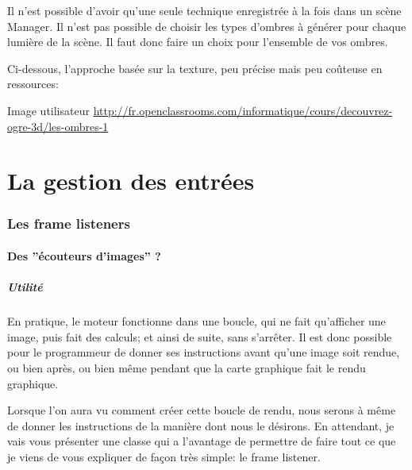 \documentclass[10pt,a4paper]{report}
\begin{document}
Il n'est possible d'avoir qu'une seule technique enregistr\'ee \`{a} la fois dans un sc\`ene Manager. Il n'est pas possible de choisir les types d'ombres \`{a} g\'en\'erer pour chaque lumi\`ere de la sc\`ene. Il faut donc faire un choix pour l'ensemble de vos ombres.

Ci-dessous, l'approche bas\'ee sur la texture, peu pr\'ecise mais peu co\^uteuse en ressources:

Image utilisateur \url{http://fr.openclassrooms.com/informatique/cours/decouvrez-ogre-3d/les-ombres-1}







\part{La gestion des entr\'ees}




\section{Les frame listeners}





\subsection{Des ''\'ecouteurs d'images'' ?}
\subsubsection{Utilit\'e}


En pratique, le moteur fonctionne dans une boucle, qui ne fait qu'afficher une image, puis fait des calculs; et ainsi de suite, sans s'arr\^eter. Il est donc possible pour le programmeur de donner ses instructions avant qu'une image soit rendue, ou bien apr\`es, ou bien m\^eme pendant que la carte graphique fait le rendu graphique.

Lorsque l'on aura vu comment cr\'eer cette boucle de rendu, nous serons \`{a} m\^eme de donner les instructions de la mani\`ere dont nous le d\'esirons. En attendant, je vais vous pr\'esenter une classe qui a l'avantage de permettre de faire tout ce que je viens de vous expliquer de fa\c{c}on tr\`es simple: le frame listener.
\end{document}

